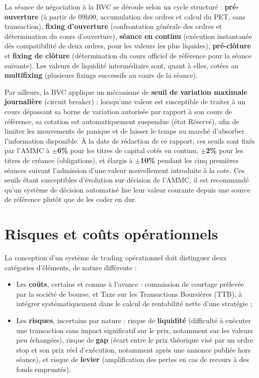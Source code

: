 \documentclass{rapportENSIAS} %
\begin{document}
\noindent
La séance de négociation à la BVC se déroule selon un cycle structuré : \textbf{pré-ouverture} (à partir de 09h00, accumulation des ordres et calcul du PET, sans transaction), \textbf{fixing d'ouverture} (confrontation générale des ordres et détermination du cours d'ouverture), \textbf{séance en continu} (exécution instantanée dès compatibilité de deux ordres, pour les valeurs les plus liquides), \textbf{pré-clôture} et \textbf{fixing de clôture} (détermination du cours officiel de référence pour la séance suivante). Les valeurs de liquidité intermédiaire sont, quant à elles, cotées au \textbf{multifixing} (plusieurs fixings successifs au cours de la séance).

\vspace{0.3cm}
\noindent
Par ailleurs, la BVC applique un mécanisme de \textbf{seuil de variation maximale journalière} (circuit breaker) : lorsqu'une valeur est susceptible de traiter à un cours dépassant sa borne de variation autorisée par rapport à son cours de référence, sa cotation est automatiquement suspendue (état \og{}Réservé\fg{}), afin de limiter les mouvements de panique et de laisser le temps au marché d'absorber l'information disponible. À la date de rédaction de ce rapport, ces seuils sont fixés par l'AMMC à \textbf{$\pm$6\%} pour les titres de capital cotés en continu, \textbf{$\pm$2\%} pour les titres de créance (obligations), et élargis à \textbf{$\pm$10\%} pendant les cinq premières séances suivant l'admission d'une valeur nouvellement introduite à la cote. Ces seuils étant susceptibles d'évolution sur décision de l'AMMC, il est recommandé qu'un système de décision automatisé lise leur valeur courante depuis une source de référence plutôt que de les coder en dur.

\section{Risques et coûts opérationnels}
\label{sec:risques-couts}

\noindent
La conception d'un système de trading opérationnel doit distinguer deux catégories d'éléments, de nature différente :

\begin{itemize}
    \item Les \textbf{coûts}, certains et connus à l'avance : commission de courtage prélevée par la société de bourse, et Taxe sur les Transactions Boursières (TTB), à intégrer systématiquement dans le calcul de rentabilité nette d'une stratégie ;
    \item Les \textbf{risques}, incertains par nature : risque de \textbf{liquidité} (difficulté à exécuter une transaction sans impact significatif sur le prix, notamment sur les valeurs peu échangées), risque de \textbf{gap} (écart entre le prix théorique visé par un ordre stop et son prix réel d'exécution, notamment après une annonce publiée hors séance), et risque de \textbf{levier} (amplification des pertes en cas de recours à des fonds empruntés).
\end{itemize}
\end{document}
